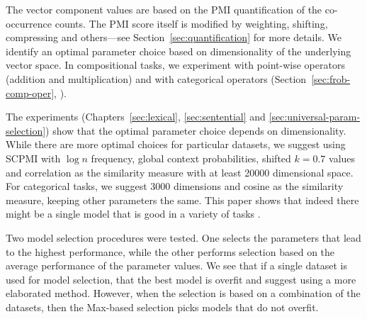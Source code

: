 \documentclass[11pt,a4paper,english,oneside]{book}
\newcommand\newcite\citet
\renewcommand\cite\citep
\begin{document}
The vector component values are based on the PMI quantification of the co-occurrence counts. The PMI score itself is modified by weighting, shifting, compressing and others---see Section~\ref{sec:quantification} for more details. We identify an optimal parameter choice based on dimensionality of the underlying vector space. In compositional tasks, we experiment with point-wise operators (addition and multiplication) and with categorical operators (Section~\ref{sec:frob-comp-oper}, \newcite{DBLP:journals/corr/abs-1003-4394}).

The experiments (Chapters~\ref{sec:lexical}, \ref{sec:sentential} and \ref{sec:universal-param-selection}) show that the optimal parameter choice depends on dimensionality. While there are more optimal choices for particular datasets, we suggest using SCPMI with $\log n$ frequency, global context probabilities, shifted $k=0.7$ values and correlation as the similarity measure with at least 20000 dimensional space. For categorical tasks, we suggest 3000 dimensions and cosine as the similarity measure, keeping other parameters the same. This paper shows that indeed there might be a single model that is good in a variety of tasks \cite{doi:10.1080/02643294.2016.1176907}.
%
%
%

Two model selection procedures were tested. One selects the parameters that lead to the highest performance, while the other performs selection based on the average performance of the parameter values. We see that if a single dataset is used for model selection, that the best model is overfit and suggest using a more elaborated method. However, when the selection is based on a combination of the datasets, then the Max-based selection picks models that do not overfit.
\end{document}
